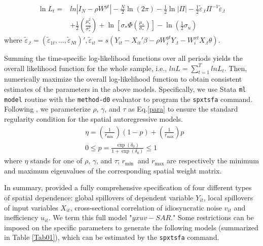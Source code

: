   \begin{equation}\label{gallilik}
	\begin{aligned}
		\ln L_{t}= & ln|I_N - \rho W^{yt}|-\frac{N}{2} \ln (2 \pi)-\frac{1}{2} \ln |\Pi|-\frac{1}{2} \tilde{\varepsilon}_{.t} \Pi^{-1} \tilde{\varepsilon}_{.t} \\
		& +\frac{1}{2}\left(\frac{\mu_{*}^{2}}{\sigma_{*}^{2}}\right)+\ln \left[\sigma_{*} \Phi\left(\frac{\mu_{*}}{\sigma_{*}}\right)\right]-\ln \left(\frac{1}{2}\sigma_{u} \right)
	\end{aligned}
\end{equation}
where $ \tilde{\varepsilon}_{.t} = ( \tilde{\varepsilon}_{1t},..., \tilde{\varepsilon}_{Nt})', \tilde{\varepsilon}_{it}=s(Y_{it}-X_{it}' \beta - \rho W_{i}^{yt}Y_{.t} -W_{i}^{xt}X_{.t} \theta)$. 

Summing the time-specific log-likelihood  functions over all periods yields the overall likelihood function for the whole sample, i.e., $lnL=\sum_{t=1}^TlnL_{t}$. Then, numerically maximize the overall log-likelihood function to obtain consistent estimates of the parameters in the above models.  Specifically, we use Stata {\tt ml model} routine with the {\tt method-d0} evaluator to program the {\tt spxtsfa} command. Following \cite{gude2018heterogeneous}, we parameterize $\rho$, $\gamma$, and $\tau$ as Eq.\eqref{para} to ensure the standard regularity condition for the spatial autoregressive models.
\begin{equation}\label{para}
\begin{aligned}
	& \eta=\left(\frac{1}{r_{\text {min }}}\right)(1-p)+\left(\frac{1}{r_{\max }}\right) p \\
	& 0 \leq p=\frac{\exp \left(\delta_0\right)}{1+\exp \left(\delta_0\right)} \leq 1
\end{aligned}
\end{equation}
where $\eta$ stands for one of $\rho$, $\gamma$, and $\tau$;  $r_{\text {min }}$ and $r_{\text {max}}$ are respectively the minimum and maximum eigenvalues of the corresponding spatial weight matrix. 

In summary, \cite{galli2022spatial} provided a fully comprehensive specification of four different types of spatial dependence: global spillovers of dependent variable $Y_{it}$, local spillovers of input variables $X_{it}$, cross-sectional correlation of idiosyncratic noise  $v_{it}$ and inefficiency $u_{it}$. We term this full model "$yxuv-SAR$." Some restrictions can be imposed on the specific parameters to generate the following  models (summarized in Table \ref{Tab01}), which can be estimated by the {\tt spxtsfa} command.


